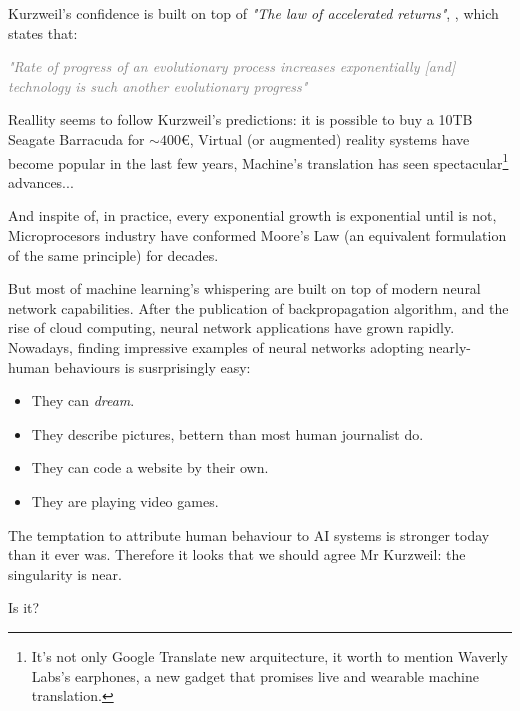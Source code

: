Kurzweil's confidence is built on top of \textit{"The law of accelerated returns"}, \cite{law}, 
which states that: 

\textcolor{gray}{
	\textit {
		\Large {
			"Rate of progress of an evolutionary process increases exponentially 
			[and] technology is such another evolutionary progress"
		}
	}
}

Reallity seems to follow Kurzweil's predictions: it is possible to buy a 10TB 
Seagate Barracuda for $\sim400$\euro{}, Virtual (or augmented) reality systems 
have become popular in the last few years, Machine's translation has seen 
spectacular\footnote{
	It's not only Google Translate new arquitecture, it worth to mention Waverly Labs's 
	earphones\cite{pilot}, a new gadget that promises live and wearable machine translation.
} advances... 

And inspite of, in practice, every exponential growth is exponential until is not,
Microprocesors industry have conformed Moore's Law (an equivalent formulation of 
the same principle) for decades.

But most of machine learning's whispering are built on top of modern neural network
capabilities. After the publication of backpropagation \cite{back} algorithm, and the rise 
of cloud computing, neural network applications have grown rapidly. Nowadays, 
finding impressive examples of neural networks adopting nearly-human behaviours 
is susrprisingly easy: 

\begin{itemize}
	\item They can \textit{dream}.\cite{dream}
	\item They describe pictures, bettern than most human journalist do.\cite{caption}
	\item They can code a website by their own.\cite{code}
	\item They are playing video games.\cite{snake}
\end{itemize}

The temptation to attribute human behaviour to AI systems is stronger today than 
it ever was. Therefore it looks that we should agree Mr Kurzweil: the singularity 
is near. 

Is it?